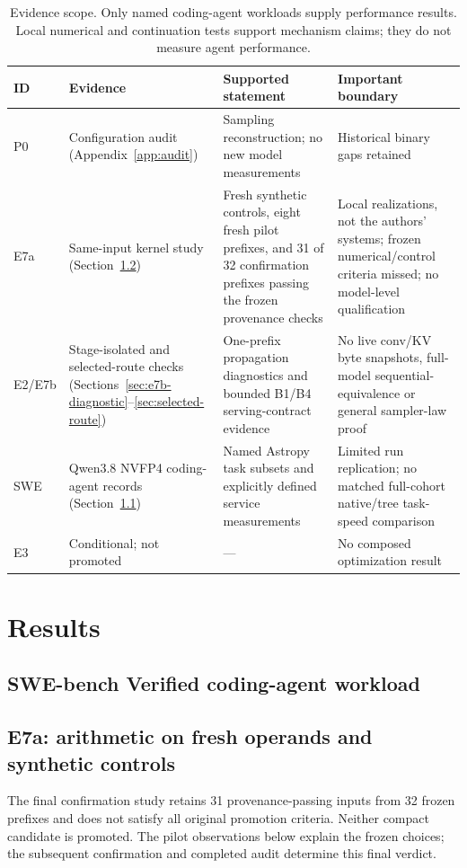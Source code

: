 \documentclass[conference]{IEEEtran}
\begin{document}
\begin{table}[t]
\caption{Evidence scope. Only named coding-agent workloads supply performance results. Local numerical and continuation tests support mechanism claims; they do not measure agent performance.}
\label{tab:evidence}
\centering\footnotesize
\begin{tabularx}{\textwidth}{@{}p{}p{}Yp{0.25\textwidth}@{}}
\toprule
ID & Evidence & Supported statement & Important boundary \\
\midrule
P0 & Configuration audit (Appendix~\ref{app:audit}) & Sampling reconstruction; no new model measurements & Historical binary gaps retained \\
E7a & Same-input kernel study (Section~\ref{sec:e7a-pilot}) & Fresh synthetic controls, eight fresh pilot prefixes, and 31 of 32 confirmation prefixes passing the frozen provenance checks & Local realizations, not the authors' systems; frozen numerical/control criteria missed; no model-level qualification \\
E2/E7b & Stage-isolated and selected-route checks (Sections~\ref{sec:e7b-diagnostic}--\ref{sec:selected-route}) & One-prefix propagation diagnostics and bounded B1/B4 serving-contract evidence & No live conv/KV byte snapshots, full-model sequential-equivalence or general sampler-law proof \\
SWE & Qwen3.8 NVFP4 coding-agent records (Section~\ref{sec:agent-workload}) & Named Astropy task subsets and explicitly defined service measurements & Limited run replication; no matched full-cohort native/tree task-speed comparison \\
E3 & Conditional; not promoted & --- & No composed optimization result \\
\bottomrule
\end{tabularx}
\end{table}

\section{Results}
\label{sec:results}
\subsection{SWE-bench Verified coding-agent workload}
\label{sec:agent-workload}


\subsection{E7a: arithmetic on fresh operands and synthetic controls}
\label{sec:e7a-pilot}
The final confirmation study retains 31 provenance-passing inputs from 32 frozen prefixes and does not satisfy all original promotion criteria. Neither compact candidate is promoted. The pilot observations below explain the frozen choices; the subsequent confirmation and completed audit determine this final verdict.
\end{document}
